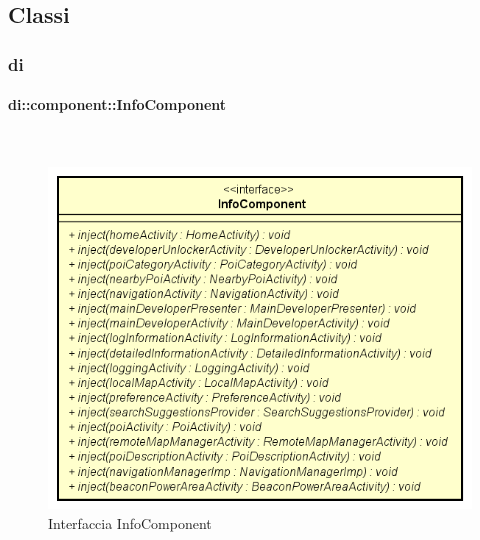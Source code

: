 \documentclass[../DefinizioneDiProdotto.tex]{subfiles}
\begin{document}
\subsection{Classi}
\subsubsection{di}

\paragraph{di::component::InfoComponent}
\
\begin{figure}[H]
	\centering
	\includegraphics[width=\maxwidth]{img/InfoComponent.png}
	\caption{Interfaccia InfoComponent}\label{fig:di::component::InfoComponent} 
\end{figure}
\end{document}
